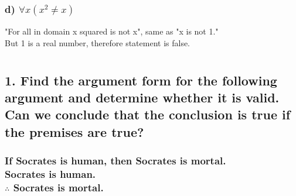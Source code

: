 \documentclass[11pt, oneside]{article} %
\numberwithin{equation}{section} %
\numberwithin{figure}{section} %
\numberwithin{table}{section} %
\begin{document}
\subsubsection{d) $\forall$$x(x^2 \neq x)$} 
"For all in domain x squared is not x", same as "x is not 1."\\
But 1 is a real number, therefore statement is false.

\section{}
\subsection{1. Find the argument form for the following argument and determine whether it is valid. Can we conclude that the conclusion is true if the premises are true?}
\subsubsection{If Socrates is human, then Socrates is mortal. \\
Socrates is human.\\
$\therefore$ Socrates is mortal.}
\end{document}
